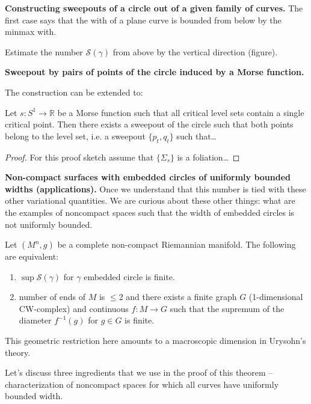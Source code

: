 \medskip\noindent
{\bf Constructing sweepouts of a circle out
of a given family of curves.}
The first case says that the with of a plane
curve is bounded from below by the minmax
with.

Estimate the number $\mathcal{S}(\gamma)$ from above by
the vertical direction (figure).

\medskip\noindent
{\bf Sweepout by pairs of points of the
circle induced by a Morse function.}

The construction can be extended to:
\begin{theorem}
\label{theorem-amm3}
Let $s:S^1 \to \mathbb{R}$ be a Morse
function such that all critical level sets
contain a single critical point.
Then there exists a sweepout of the circle
such that both points belong to the level
set, i.e. a sweepout $\{p_t,q_t\}$ such
that…
\end{theorem}

\begin{proof}
For this proof sketch assume that
$\{\Sigma_s\}$ is a foliation…
\end{proof}


\medskip\noindent
{\bf Non-compact surfaces with embedded
circles of uniformly bounded widths
(applications).}
Once we understand that this number is tied
with these other variational quantities.
We are curious about these other things:
what are the examples of noncompact spaces
such that the width of embedded circles is
not uniformly bounded.

\begin{theorem}
\label{theorem-amm4}
Let $(M^n,g)$ be a complete non-compact
Riemannian manifold. The following are
equivalent:
\begin{enumerate}
\item $\operatorname{sup}
\mathcal{S}(\gamma)$ for $\gamma$ embedded
circle is finite.
\item number of ends of $M$ is $\leq  $2 and
there exists a finite graph $G$
(1-dimensional CW-complex) and continuous
$f:M \to G$ such that the supremum of the
diameter $f^{-1}(g)$ for $g \in G$ is
finite.
\end{enumerate}
\end{theorem}

\noindent
This geometric restriction here amounts to a
macroscopic dimension in Urysohn's theory.

Let's discuss three ingredients that we use
in the proof of this theorem --
characterization of noncompact spaces for
which all curves have uniformly bounded
width.

